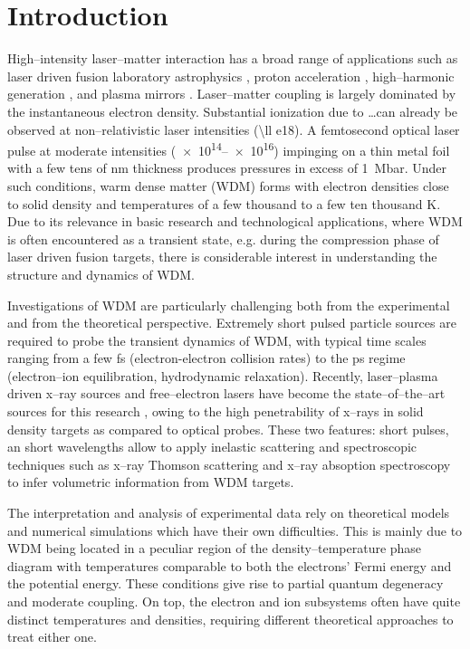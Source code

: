 \documentclass[preprint, 12pt]{elsarticle}
\begin{document}
%
\section{Introduction\label{sec:Introduction}}%
High--intensity laser--matter interaction has a broad range of
applications such as laser driven fusion \cite{Lindl2004,Atzeni2004} laboratory
astrophysics \cite{Nettelmann2008a}, proton acceleration \cite{Pukhov2001},
high--harmonic generation \cite{Chin2001,Ghimire2010}, and plasma mirrors
\cite{Kapteyn1991}.
Laser--matter coupling is largely dominated by the instantaneous electron density.
Substantial ionization due to \ldots can already be observed at
non--relativistic laser intensities (\SI{\ll
e18}{\Wsqcm}). A femtosecond optical laser pulse at moderate intensities
(\SIrange{e14}{e16}{\Wsqcm}) impinging on a thin
metal foil with a few tens of \si{\nm} thickness produces pressures in excess of
\SI{1}{\mega\bar}. Under such conditions, warm dense matter (WDM)
\cite{Lee2003a} forms with electron densities close to solid density and temperatures of a few
thousand to a few ten thousand \si{\K}. Due to its relevance in basic research
and technological applications, where WDM is often encountered as a transient
state, e.g. during the compression phase of laser driven fusion targets, there
is considerable interest in understanding the structure and dynamics of WDM.

Investigations of WDM are particularly challenging both from the experimental and from the
theoretical perspective. Extremely short pulsed particle sources are required to
probe the transient dynamics of WDM, with typical time scales ranging from a
few \si{\fs} (electron-electron collision rates) to the \si{\ps} regime
(electron--ion equilibration, hydrodynamic relaxation). Recently, laser--plasma driven x--ray sources
and free--electron lasers have become the state--of--the--art sources for this
research \cite{Lee2003}, owing to the high penetrability of x--rays in solid
density targets as compared to optical probes. These two features: short pulses,
an short wavelengths allow to apply inelastic scattering and
spectroscopic techniques such as x--ray Thomson scattering \cite{Glenzer2009}
and x--ray absoption spectroscopy \cite{Torchio2016} to infer volumetric
information from WDM targets.

The interpretation and analysis of experimental data
rely on theoretical models
and numerical simulations which have their own difficulties.
This is mainly due to WDM being located in a peculiar region of the density--temperature phase
diagram with temperatures comparable to both the electrons' Fermi energy and the
potential energy. These conditions give rise to partial quantum degeneracy and
moderate coupling. On top, the electron and ion subsystems often have quite distinct
temperatures and densities, requiring different theoretical approaches to treat
either one.
\end{document}

